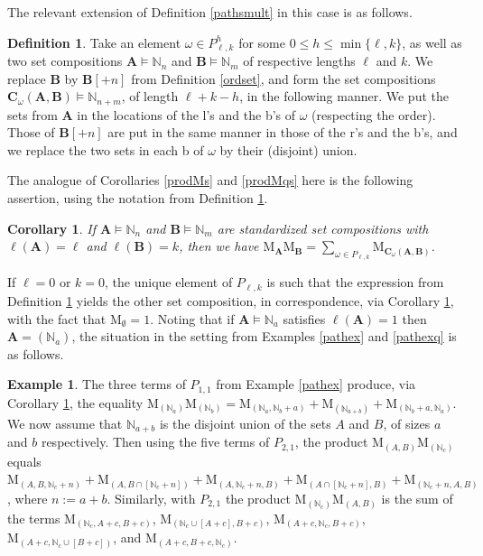 \documentclass{article}
\newtheorem{cor}[thm]{Corollary}
\theoremstyle{definition}
\newtheorem{defn}[thm]{Definition}
\newtheorem{ex}[thm]{Example}
\begin{document}
The relevant extension of Definition \ref{pathsmult} in this case is as follows.
\begin{defn}
Take an element $\omega \in P_{\ell,k}^{h}$ for some $0 \leq h\leq\min\{\ell,k\}$, as well as two set compositions $\mathbf{A}\vDash\mathbb{N}_{n}$ and $\mathbf{B}\vDash\mathbb{N}_{m}$ of respective lengths $\ell$ and $k$. We replace $\mathbf{B}$ by $\mathbf{B}{[+n]}$ from Definition \ref{ordset}, and form the set compositions $\mathbf{C}_{\omega}(\mathbf{A},\mathbf{B})\vDash\mathbb{N}_{n+m}$, of length $\ell+k-h$, in the following manner. We put the sets from $\mathbf{A}$ in the locations of the l's and the b's of $\omega$ (respecting the order). Those of $\mathbf{B}[+n]$ are put in the same manner in those of the r's and the b's, and we replace the two sets in each b of $\omega$ by their (disjoint) union. \label{pathsNCQ}
\end{defn}
The analogue of Corollaries \ref{prodMs} and \ref{prodMqs} here is the following assertion, using the notation from Definition \ref{pathsNCQ}.
\begin{cor}
If $\mathbf{A}\vDash\mathbb{N}_{n}$ and $\mathbf{B}\vDash\mathbb{N}_{m}$ are standardized set compositions with $\ell(\mathbf{A})=\ell$ and $\ell(\mathbf{B})=k$, then we have $\mathrm{M}_{\mathbf{A}}\mathrm{M}_{\mathbf{B}}=\sum_{\omega \in P_{\ell,k}}\mathrm{M}_{\mathbf{C}_{\omega}(\mathbf{A},\mathbf{B})}$. \label{prodNCMs}
\end{cor}
If $\ell=0$ or $k=0$, the unique element of $P_{\ell,k}$ is such that the expression from Definition \ref{pathsNCQ} yields the other set composition, in correspondence, via Corollary \ref{prodNCMs}, with the fact that $\mathrm{M}_{\emptyset}=1$. Noting that if $\mathbf{A}\vDash\mathbb{N}_{a}$ satisfies $\ell(\mathbf{A})=1$ then $\mathbf{A}=(\mathbb{N}_{a})$, the situation in the setting from Examples \ref{pathex} and \ref{pathexq} is as follows.
\begin{ex}
The three terms of $P_{1,1}$ from Example \ref{pathex} produce, via Corollary \ref{prodNCMs}, the equality $\mathrm{M}_{(\mathbb{N}_{a})}\mathrm{M}_{(\mathbb{N}_{b})}=\mathrm{M}_{(\mathbb{N}_{a},\mathbb{N}_{b}+a)}+\mathrm{M}_{(\mathbb{N}_{a+b})}+\mathrm{M}_{(\mathbb{N}_{b}+a,\mathbb{N}_{a})}$. We now assume that $\mathbb{N}_{a+b}$ is the disjoint union of the sets $A$ and $B$, of sizes $a$ and $b$ respectively. Then using the five terms of $P_{2,1}$, the product $\mathrm{M}_{(A,B)}\mathrm{M}_{(\mathbb{N}_{c})}$ equals $\mathrm{M}_{(A,B,\mathbb{N}_{c}+n)}+\mathrm{M}_{(A,B\cap[\mathbb{N}_{c}+n])}+\mathrm{M}_{(A,\mathbb{N}_{c}+n,B)}+\mathrm{M}_{(A\cap[\mathbb{N}_{c}+n],B)}+\mathrm{M}_{(\mathbb{N}_{c}+n,A,B)}$, where $n:=a+b$. Similarly, with $P_{2,1}$ the product $\mathrm{M}_{(\mathbb{N}_{c})}\mathrm{M}_{(A,B)}$ is the sum of the terms $\mathrm{M}_{(\mathbb{N}_{c},A+c,B+c)}$, $\mathrm{M}_{(\mathbb{N}_{c}\cup[A+c],B+c)}$, $\mathrm{M}_{(A+c,\mathbb{N}_{c},B+c)}$, $\mathrm{M}_{(A+c,\mathbb{N}_{c}\cup[B+c])}$, and $\mathrm{M}_{(A+c,B+c,\mathbb{N}_{c})}$. \label{pathNCex}
\end{ex}
\end{document}
